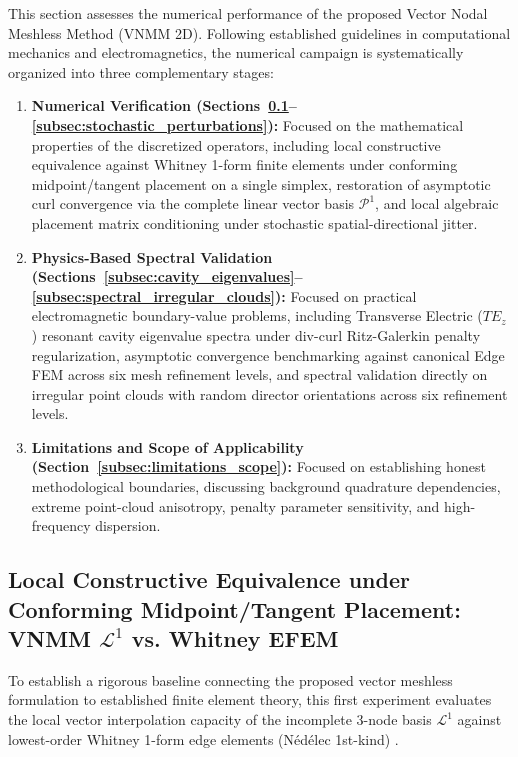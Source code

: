 \documentclass[preprint,12pt]{elsarticle}
\begin{document}
This section assesses the numerical performance of the proposed Vector Nodal Meshless Method (VNMM 2D). Following established guidelines in computational mechanics and electromagnetics, the numerical campaign is systematically organized into three complementary stages:
\begin{enumerate}
    \item \textbf{Numerical Verification (Sections~\ref{subsec:conforming_dual_equivalence}--\ref{subsec:stochastic_perturbations}):} Focused on the mathematical properties of the discretized operators, including local constructive equivalence against Whitney 1-form finite elements under conforming midpoint/tangent placement on a single simplex, restoration of asymptotic curl convergence via the complete linear vector basis $\mathcal{P}^1$, and local algebraic placement matrix conditioning under stochastic spatial-directional jitter.
    \item \textbf{Physics-Based Spectral Validation (Sections~\ref{subsec:cavity_eigenvalues}--\ref{subsec:spectral_irregular_clouds}):} Focused on practical electromagnetic boundary-value problems, including Transverse Electric ($TE_z$) resonant cavity eigenvalue spectra under div-curl Ritz-Galerkin penalty regularization, asymptotic convergence benchmarking against canonical Edge FEM across six mesh refinement levels, and spectral validation directly on irregular point clouds with random director orientations across six refinement levels.
    \item \textbf{Limitations and Scope of Applicability (Section~\ref{subsec:limitations_scope}):} Focused on establishing honest methodological boundaries, discussing background quadrature dependencies, extreme point-cloud anisotropy, penalty parameter sensitivity, and high-frequency dispersion.
\end{enumerate}

\subsection{Local Constructive Equivalence under Conforming Midpoint/Tangent Placement: VNMM \texorpdfstring{$\mathcal{L}^1$}{L1} vs. Whitney EFEM}
\label{subsec:conforming_dual_equivalence}

To establish a rigorous baseline connecting the proposed vector meshless formulation to established finite element theory, this first experiment evaluates the local vector interpolation capacity of the incomplete 3-node basis $\mathcal{L}^1$ against lowest-order Whitney 1-form edge elements (N\'ed\'elec 1st-kind) \cite{nedelec1980mixed, monk2003finite}.
\end{document}
